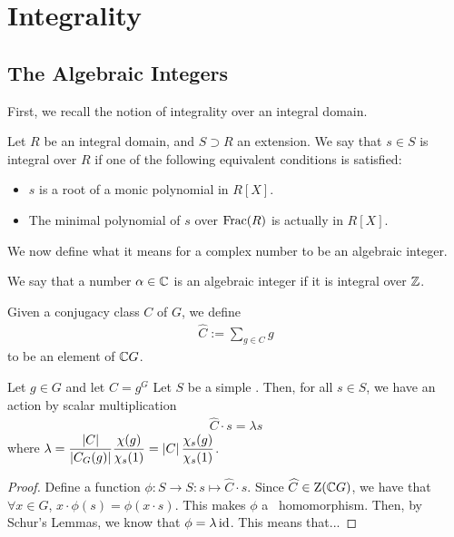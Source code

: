 \section{Integrality}

\subsection{The Algebraic Integers}

First, we recall the notion of integrality over an integral domain.

\begin{boxdefinition}[Integrality]
    Let $R$ be an integral domain, and $S \supset R$ an extension. We say that $s \in S$ is integral over $R$ if one of the following equivalent conditions is satisfied:
    \begin{itemize}
        \item $s$ is a root of a monic polynomial in $R[X]$.
        \item The minimal polynomial of $s$ over $\operatorname{Frac}\!\left( R \right)$ is actually in $R[X]$.
    \end{itemize}
\end{boxdefinition}
We now define what it means for a complex number to be an algebraic integer.
\begin{boxdefinition}
    We say that a number $\alpha \in \mathbb{C}$ is an algebraic integer if it is integral over $\mathbb{Z}$.
\end{boxdefinition}

\begin{boxnotation}
    Given a conjugacy class $C$ of $G$, we define
    \begin{align}
        \hat{C} := \sum_{g \in C} g
    \end{align}
    to be an element of $\mathbb{C} G$.
\end{boxnotation}

\begin{lemma} \label{Ch2:Lem:Scalar_Action_Alg_Int}
    Let $g \in G$ and let $C = g^G$ %
    Let $S$ be a simple \CGM. Then, for all $s \in S$, we have an action by scalar multiplication
    \begin{align*}
        \hat{C} \cdot s = \lambda s
    \end{align*}
    where $\displaystyle \lambda = \frac{\left\lvert C \right\rvert}{\left\lvert C_G(g) \right\rvert} \frac{\chi(g)}{\chi_s(1)} = \left\lvert C \right\rvert \frac{\chi_s(g)}{\chi_s(1)}$.
\end{lemma}
\begin{proof}
    Define a function $\phi : S \to S : s \mapsto \hat{C} \cdot s$. Since $\widehat{C} \in \operatorname{Z}\!\left( \mathbb{C} G \right)$, %
    we have that $\forall x \in G$, $x \cdot \phi(s) = \phi(x \cdot s)$. This makes $\phi$ a \CGM\ homomorphism. Then, by Schur's Lemmas, we know that $\phi = \lambda \operatorname{id}$. This means that... %
\end{proof}

